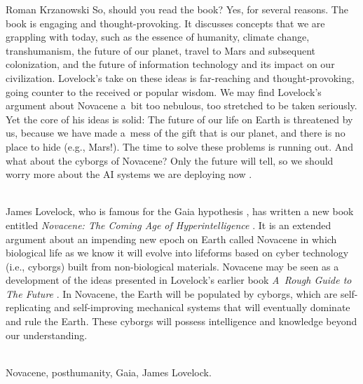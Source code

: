 \begin{newrevengenv}{Roman Krzanowski}
So, should you read the book? Yes, for several reasons. The book is engaging and thought-provoking. It discusses concepts that we are grappling with today, such as the essence of humanity, climate change, transhumanism, the future of our planet, travel to Mars and subsequent colonization, and the future of information technology and its impact on our civilization. Lovelock's take on these ideas is far-reaching and thought-provoking, going counter to the received or popular wisdom. We may find Lovelock's argument about Novacene a~bit too nebulous, too stretched to be taken seriously. Yet the core of his ideas is solid: The future of our life on Earth is threatened by us, because we have made a~mess of the gift that is our planet, and there is no place to hide (e.g., Mars!). The time to solve these problems is running out. And what about the cyborgs of Novacene? Only the future will tell, so we should worry more about the AI systems we are deploying now
\parencites[see for example][]{zuboff_age_2019}[][]{oneil_weapons_2016}[or][]{wylie_mindfck_2019}.%








\vspace{15mm}%
{}\\
{James Lovelock,
who is famous for the Gaia hypothesis \parencite*{lovelock_gaia:_1979}, has written a new book entitled \textit{Novacene: The Coming Age of Hyperintelligence} \parencite*{lovelock_novacene_2019}. It is an extended argument about an impending new epoch on Earth called Novacene in which biological life as we know it will evolve into lifeforms based on cyber technology (i.e., cyborgs) built from non-biological materials. Novacene may be seen as a development of the ideas presented in Lovelock’s earlier book \textit{A~Rough Guide to The Future} \parencite*{lovelock_rough_2014}. In Novacene, the Earth will be populated by cyborgs, which are self-replicating and self-improving mechanical systems that will eventually dominate and rule the Earth. These cyborgs will possess intelligence and knowledge beyond our understanding.}\par%
\vspace{2mm}%
{}\\
{Novacene, posthumanity, Gaia, James Lovelock.}%



\end{newrevengenv}